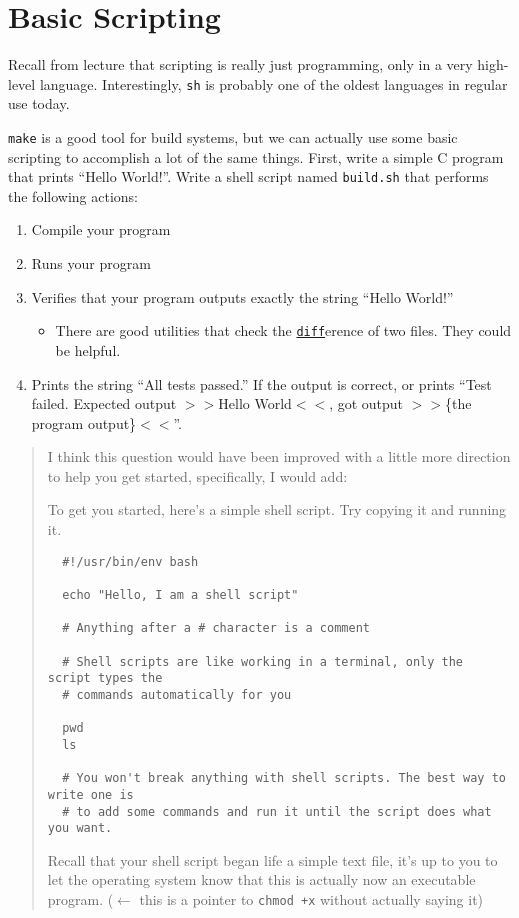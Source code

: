 \documentclass{article}
\begin{document}
\newpage
\section{Basic Scripting}

Recall from lecture that scripting is really just programming, only in a very
high-level language. Interestingly, \texttt{sh} is probably one of the oldest
languages in regular use today.

\texttt{make} is a good tool for build systems, but we can actually use some
basic scripting to accomplish a lot of the same things.
First, write a simple C program that prints ``Hello World!''.
Write a shell script named \texttt{build.sh} that performs the following
actions:
\begin{enumerate}
  \item Compile your program
  \item Runs your program
  \item Verifies that your program outputs exactly the string ``Hello World!''
    \begin{itemize}
      \item There are good utilities that check the \texttt{\ul{diff}}erence of two
        files. They could be helpful.
    \end{itemize}
  \item Prints the string ``All tests passed.'' If the output is correct, or
    prints ``Test failed. Expected output $>>$Hello World$<<$, got
    output $>>$\{the program output\}$<<$''.
\end{enumerate}

\begin{quote}
  \color{red}
  I think this question would have been improved with a little more direction
  to help you get started, specifically, I would add:

  To get you started, here's a simple shell script. Try copying it and running it.
  \begin{lstlisting}
  #!/usr/bin/env bash

  echo "Hello, I am a shell script"

  # Anything after a # character is a comment

  # Shell scripts are like working in a terminal, only the script types the
  # commands automatically for you

  pwd
  ls

  # You won't break anything with shell scripts. The best way to write one is
  # to add some commands and run it until the script does what you want.
  \end{lstlisting}

  Recall that your shell script began life a simple text file, it's up to you
  to let the operating system know that this is actually now an executable
  program. ($\leftarrow$ this is a pointer to \texttt{chmod +x} without
  actually saying it)
\end{quote}
\end{document}

